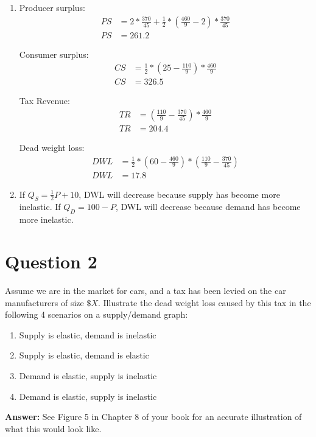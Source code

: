 \documentclass[12pt]{article}
\begin{document}
\begin{enumerate}[label = (\alph*)]
\begin{center}
\end{center}

\item Producer surplus:
\begin{align*}
    PS &= 2*\frac{370}{45} + \frac{1}{2}*(\frac{460}{9} - 2)*\frac{370}{45} \\
    PS & = 261.2
\end{align*}

Consumer surplus:
\begin{align*}
    CS & = \frac{1}{2}*(25-\frac{110}{9})*\frac{460}{9} \\
    CS &= 326.5
\end{align*}

Tax Revenue:
\begin{align*}
    TR &= (\frac{110}{9} - \frac{370}{45})*\frac{460}{9} \\
    TR &= 204.4
\end{align*}

Dead weight loss:
\begin{align*}
    DWL &= \frac{1}{2} * (60-\frac{460}{9})*(\frac{110}{9} - \frac{370}{45}) \\
    DWL &= 17.8
\end{align*}

\item If \(Q_S = \frac{1}{2}P + 10\), DWL will decrease because supply has become more inelastic. If $Q_D = 100-P$, DWL will decrease because demand has become more inelastic.

\end{enumerate}

\newpage
\section*{Question 2}
Assume we are in the market for cars, and a tax has been levied on the car manufacturers of size $\$X$. Illustrate the dead weight loss caused by this tax in the following 4 scenarios on a supply/demand graph:
\begin{enumerate}[label = (\alph*)]
    \item Supply is elastic, demand is inelastic
    \item Supply is elastic, demand is elastic
    \item Demand is elastic, supply is inelastic
    \item Demand is elastic, supply is inelastic
\end{enumerate}
\vspace{2mm}
\textbf{Answer:}
See Figure 5 in Chapter 8 of your book for an accurate illustration of what this would look like. 
\end{document}
